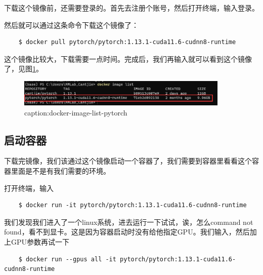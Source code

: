 下载这个镜像前，还需要登录的。首先去注册个账号，然后打开终端，输入登录。

然后就可以通过这条命令下载这个镜像了：

\begin{lstlisting}
    $ docker pull pytorch/pytorch:1.13.1-cuda11.6-cudnn8-runtime
\end{lstlisting}


这个镜像比较大，下载需要一点时间。完成后，我们再输入就可以看到这个镜像了，见图\ref{fig:docker-image-list-pytorch}。
\begin{figure}[htbp]
	\centering
	\includegraphics[width=0.9\textwidth]{figures/docker-image-list-pytorch.png}
	\caption{caption:docker-image-list-pytorch}
	\label{fig:docker-image-list-pytorch}
\end{figure}

\subsection{启动容器}

下载完镜像，我们该通过这个镜像启动一个容器了，我们需要到容器里看看这个容器里面是不是有我们需要的环境。

打开终端，输入
\begin{lstlisting}
    $ docker run -it pytorch/pytorch:1.13.1-cuda11.6-cudnn8-runtime
\end{lstlisting}
我们发现我们进入了一个linux系统，进去运行一下试试，诶，怎么command not found，看不到显卡。这是因为容器启动时没有给他指定GPU。我们输入，然后加上GPU参数再试一下
\begin{lstlisting}
    $ docker run --gpus all -it pytorch/pytorch:1.13.1-cuda11.6-cudnn8-runtime 
\end{lstlisting}

